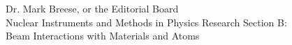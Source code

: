 \documentclass{letter} %
\begin{document}
\begin{letter}{Dr. Mark Breese, or the Editorial Board \\
Nuclear Instruments and Methods in Physics Research Section B: \\
Beam Interactions with Materials and Atoms}









\end{letter}
\end{document}
